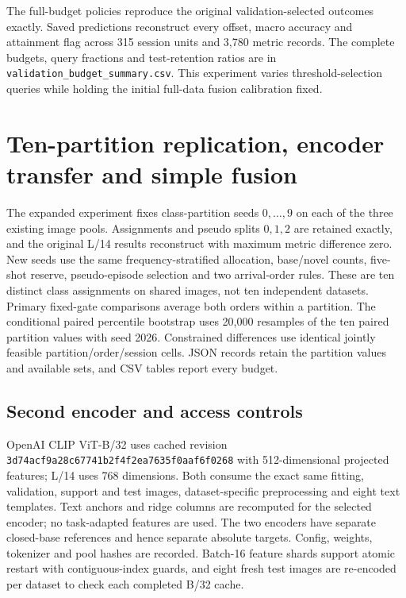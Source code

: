 \documentclass[preprint,review,12pt]{elsarticle}
\begin{document}
The full-budget policies reproduce the original validation-selected outcomes exactly. Saved predictions reconstruct every offset, macro accuracy and attainment flag across 315 session units and 3,780 metric records. The complete budgets, query fractions and test-retention ratios are in \nolinkurl{validation_budget_summary.csv}. This experiment varies threshold-selection queries while holding the initial full-data fusion calibration fixed.

\FloatBarrier
\section{Ten-partition replication, encoder transfer and simple fusion}
\label{app:replication}
The expanded experiment fixes class-partition seeds $0,\ldots,9$ on each of the
three existing image pools. Assignments and pseudo splits $0,1,2$ are retained
exactly, and the original L/14 results reconstruct with maximum metric difference
zero. New seeds use the same frequency-stratified allocation, base/novel counts,
five-shot reserve, pseudo-episode selection and two arrival-order rules. These
are ten distinct class assignments on shared images, not ten independent datasets.
Primary fixed-gate comparisons average both orders within a partition. The
conditional paired percentile bootstrap uses 20,000 resamples of the ten paired
partition values with seed 2026. Constrained differences use identical jointly
feasible partition/order/session cells. JSON records retain the partition values
and available sets, and CSV tables report every budget.

\subsection{Second encoder and access controls}
OpenAI CLIP ViT-B/32 uses cached revision
\nolinkurl{3d74acf9a28c67741b2f4f2ea7635f0aaf6f0268} with 512-dimensional projected
features; L/14 uses 768 dimensions. Both consume the exact same fitting,
validation, support and test images, dataset-specific preprocessing and eight
text templates. Text anchors and ridge columns are recomputed for the selected
encoder; no task-adapted features are used. The two encoders have separate
closed-base references and hence separate absolute targets. Config, weights,
tokenizer and pool hashes are recorded. Batch-16 feature shards support atomic
restart with contiguous-index guards, and eight fresh test images are re-encoded
per dataset to check each completed B/32 cache.
\end{document}
